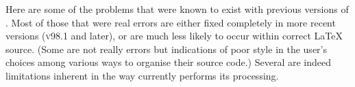 \internal{}%
\startdocument
%
\label{sec:prb}%
\tableofchildlinks*\htmlrule{}\html{\\}%
\noindent
Here are some of the problems that were known to exist
with previous versions of \latextohtml. 
Most of those that were real errors are either fixed completely
in more recent versions (\textsc{v98.1} and later),
or are much less likely to occur within correct \LaTeX{} source. 
(Some are not really errors but indications of poor style
in the user's choices among
various ways to organise their source code.)\html{\\} 
Several are indeed limitations inherent in the way 
\latextohtml{} currently performs its processing.
%
